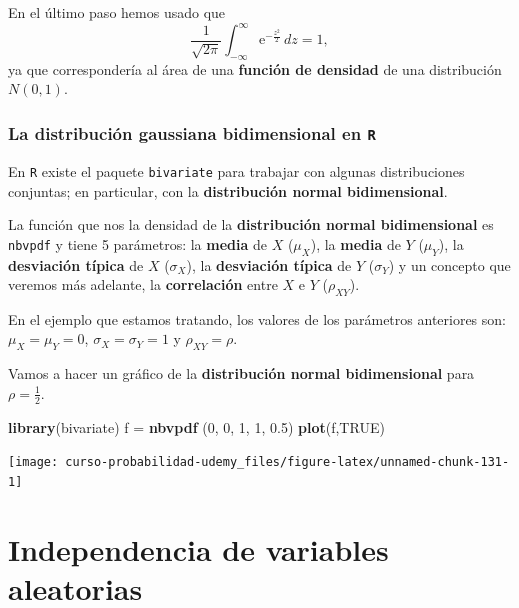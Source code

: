 \documentclass[]{book}
\newenvironment{Shaded}{\begin{snugshade}}{\end{snugshade}}
\newcommand{\DecValTok}[1]{\textcolor[rgb]{0.00,0.00,0.81}{#1}}
\newcommand{\FloatTok}[1]{\textcolor[rgb]{0.00,0.00,0.81}{#1}}
\newcommand{\KeywordTok}[1]{\textcolor[rgb]{0.13,0.29,0.53}{\textbf{#1}}}
\newcommand{\NormalTok}[1]{#1}
\newcommand{\OtherTok}[1]{\textcolor[rgb]{0.56,0.35,0.01}{#1}}
\newcommand{\StringTok}[1]{\textcolor[rgb]{0.31,0.60,0.02}{#1}}
\begin{document}
En el último paso hemos usado que
\[
\frac{1}{\sqrt{2\pi}}\int_{-\infty}^\infty \mathrm{e}^{-\frac{z^2}{2}}\, dz=1,
\]
ya que correspondería al área de una \textbf{función de densidad} de una distribución \(N(0,1)\).

\hypertarget{la-distribuciuxf3n-gaussiana-bidimensional-en-r}{%
\subsubsection{\texorpdfstring{La distribución gaussiana bidimensional en \texttt{R}}{La distribución gaussiana bidimensional en R}}\label{la-distribuciuxf3n-gaussiana-bidimensional-en-r}}

En \texttt{R} existe el paquete \texttt{bivariate} para trabajar con algunas distribuciones conjuntas; en particular, con la \textbf{distribución normal bidimensional}.

La función que nos la densidad de la \textbf{distribución normal bidimensional} es \texttt{nbvpdf} y tiene 5 parámetros: la \textbf{media} de \(X\) (\(\mu_X\)), la \textbf{media} de \(Y\) (\(\mu_Y\)), la \textbf{desviación típica} de \(X\) (\(\sigma_X\)), la \textbf{desviación típica} de \(Y\) (\(\sigma_Y\)) y un concepto que veremos más adelante, la \textbf{correlación} entre \(X\) e \(Y\) (\(\rho_{XY}\)).

En el ejemplo que estamos tratando, los valores de los parámetros anteriores son: \(\mu_X=\mu_Y=0\), \(\sigma_X=\sigma_Y=1\) y \(\rho_{XY}=\rho.\)

Vamos a hacer un gráfico de la \textbf{distribución normal bidimensional} para \(\rho=\frac{1}{2}.\)

\begin{Shaded}
\begin{Highlighting}[]
\KeywordTok{library}\NormalTok{(bivariate)}
\NormalTok{f =}\StringTok{ }\KeywordTok{nbvpdf}\NormalTok{ (}\DecValTok{0}\NormalTok{, }\DecValTok{0}\NormalTok{, }\DecValTok{1}\NormalTok{, }\DecValTok{1}\NormalTok{, }\FloatTok{0.5}\NormalTok{)}
\KeywordTok{plot}\NormalTok{(f,}\OtherTok{TRUE}\NormalTok{)}
\end{Highlighting}
\end{Shaded}

\begin{center}\texttt{[image: curso-probabilidad-udemy\_files/figure-latex/unnamed-chunk-131-1]} \end{center}

\hypertarget{independencia-de-variables-aleatorias}{%
\section{Independencia de variables aleatorias}\label{independencia-de-variables-aleatorias}}
\end{document}
